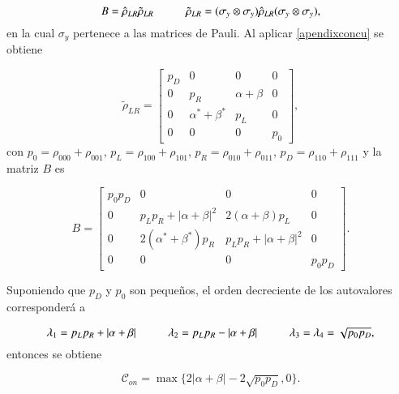 \begin{appendixs}
\begin{equation}
    B = \hat{\rho}_{LR} \tilde{\rho}_{LR} \hspace{10mm} \tilde{\rho}_{LR} = (\sigma_{y} \otimes \sigma_{y}) \hat{\rho}_{LR} (\sigma_{y} \otimes \sigma_{y}),
    \label{apendixconcu}
\end{equation}
en la cual $\sigma_{y}$ pertenece a las matrices de Pauli. Al aplicar \ref{apendixconcu} se obtiene 

\begin{equation*}
    \tilde{\rho}_{LR} = 
    \begin{bmatrix}
        p_{D} & 0 & 0 & 0  \\
        0 & p_{R} & \alpha + \beta & 0  \\
        0 & \alpha^{*} +\beta^{*} & p_{L} & 0  \\
        0 & 0 & 0 & p_{0} 
        \end{bmatrix},
\end{equation*}
con  $p_{0}=\rho_{000}+\rho_{001}$, $p_{L}=\rho_{100} + \rho_{101}$, $p_{R}=\rho_{010}+\rho_{011}$, $p_{D}=\rho_{110}+\rho_{111}$  y la matriz $B$ es

\begin{equation*}
    B = 
    \begin{bmatrix}
        p_{0}p_{D} & 0 & 0 & 0  \\
        0 & p_{L}p_{R}+|\alpha+\beta|^{2} & 2(\alpha + \beta)p_{L} & 0  \\
        0 & 2(\alpha^{*} +\beta^{*})p_{R} & p_{L}p_{R}+|\alpha+\beta|^{2}  & 0  \\
        0 & 0 & 0 & p_{0}p_{D}
        \end{bmatrix}.
\end{equation*}

Suponiendo que $p_{D}$ y $p_{0}$ son pequeños, el orden decreciente de los autovalores corresponderá a

\begin{equation*}
    \lambda_{1} = p_{L}p_{R} + |\alpha + \beta| \hspace{10mm}  \lambda_{2} = p_{L}p_{R} - |\alpha + \beta| \hspace{10mm} \lambda_{3}=\lambda_{4} = \sqrt{p_{0}p_{D}},
\end{equation*}
entonces se obtiene

\begin{equation*}
    \mathcal{C}_{on} = \max\{ 2|\alpha+\beta| - 2\sqrt{p_{0}p_{D}},0\}.
\end{equation*}


\end{appendixs}
